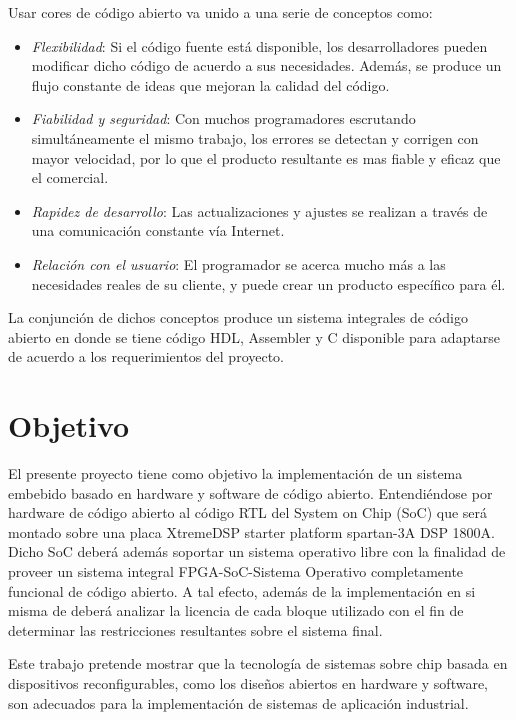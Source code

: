 Usar cores de código abierto va unido a una serie de conceptos como:
\begin{itemize}
\item \textit{Flexibilidad}: Si el código fuente está disponible, los
  desarrolladores pueden modificar dicho código de acuerdo a sus
  necesidades. Además, se produce un flujo constante de ideas que
  mejoran la calidad del código.
\item \textit{Fiabilidad y seguridad}: Con muchos programadores
  escrutando simultáneamente el mismo trabajo, los errores se detectan
  y corrigen con mayor velocidad, por lo que el producto resultante es
  mas fiable y eficaz que el comercial.
\item \textit{Rapidez de desarrollo}: Las actualizaciones y ajustes se
  realizan a través de una comunicación constante vía Internet.
\item \textit{Relación con el usuario}: El programador se acerca mucho
  más a las necesidades reales de su cliente, y puede crear un
  producto específico para él.
\end{itemize}

La conjunción de dichos conceptos produce un sistema integrales de
código abierto en donde se tiene código HDL, Assembler y C disponible
para adaptarse de acuerdo a los requerimientos del proyecto.

\section{Objetivo}

El presente proyecto tiene como objetivo la implementación de un
sistema embebido basado en hardware y software de código
abierto. Entendiéndose por hardware de código abierto al código RTL
del System on Chip (SoC) que será montado sobre una placa XtremeDSP starter platform spartan-3A DSP 1800A.
Dicho SoC deberá además soportar un sistema operativo
libre con la finalidad de proveer un sistema integral FPGA-SoC-Sistema
Operativo completamente funcional de código abierto. A tal efecto,
además de la implementación en si misma de deberá analizar la licencia
de cada bloque utilizado con el fin de determinar las restricciones
resultantes sobre el sistema final.

Este trabajo pretende mostrar que la tecnología de sistemas sobre chip
basada en dispositivos reconfigurables, como los diseños abiertos en
hardware y software, son adecuados para la implementación de sistemas
de aplicación industrial.

